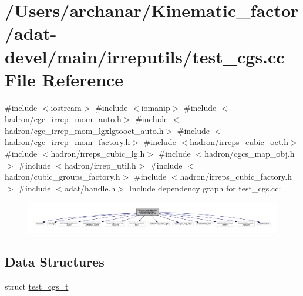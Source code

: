 \hypertarget{adat-devel_2main_2irreputils_2test__cgs_8cc}{}\section{/\+Users/archanar/\+Kinematic\+\_\+factor/adat-\/devel/main/irreputils/test\+\_\+cgs.cc File Reference}
\label{adat-devel_2main_2irreputils_2test__cgs_8cc}
{\ttfamily \#include $<$iostream$>$}\newline
{\ttfamily \#include $<$iomanip$>$}\newline
{\ttfamily \#include $<$hadron/cgc\+\_\+irrep\+\_\+mom\+\_\+auto.\+h$>$}\newline
{\ttfamily \#include $<$hadron/cgc\+\_\+irrep\+\_\+mom\+\_\+lgxlgtooct\+\_\+auto.\+h$>$}\newline
{\ttfamily \#include $<$hadron/cgc\+\_\+irrep\+\_\+mom\+\_\+factory.\+h$>$}\newline
{\ttfamily \#include $<$hadron/irreps\+\_\+cubic\+\_\+oct.\+h$>$}\newline
{\ttfamily \#include $<$hadron/irreps\+\_\+cubic\+\_\+lg.\+h$>$}\newline
{\ttfamily \#include $<$hadron/cgcs\+\_\+map\+\_\+obj.\+h$>$}\newline
{\ttfamily \#include $<$hadron/irrep\+\_\+util.\+h$>$}\newline
{\ttfamily \#include $<$hadron/cubic\+\_\+groups\+\_\+factory.\+h$>$}\newline
{\ttfamily \#include $<$hadron/irreps\+\_\+cubic\+\_\+factory.\+h$>$}\newline
{\ttfamily \#include $<$adat/handle.\+h$>$}\newline
Include dependency graph for test\+\_\+cgs.\+cc\+:
\nopagebreak
\begin{figure}[H]
\begin{center}
\leavevmode
\includegraphics[width=350pt]{d2/d6f/adat-devel_2main_2irreputils_2test__cgs_8cc__incl}
\end{center}
\end{figure}
\subsection*{Data Structures}
\begin{DoxyCompactItemize}
\item 
struct \mbox{\hyperlink{structtest__cgs__t}{test\+\_\+cgs\+\_\+t}}
\end{DoxyCompactItemize}
